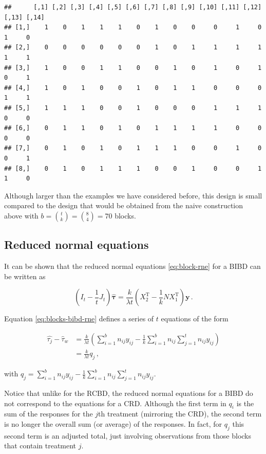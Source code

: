 \documentclass[
]{book}
\theoremstyle{definition}
\theoremstyle{definition}
\theoremstyle{definition}
\theoremstyle{definition}
\theoremstyle{remark}
\begin{document}
\begin{verbatim}
##      [,1] [,2] [,3] [,4] [,5] [,6] [,7] [,8] [,9] [,10] [,11] [,12] [,13] [,14]
## [1,]    1    0    1    1    1    0    1    0    0     0     1     0     1     0
## [2,]    0    0    0    0    0    0    1    0    1     1     1     1     1     1
## [3,]    1    0    0    1    1    0    0    1    0     1     0     1     0     1
## [4,]    1    0    1    0    0    1    0    1    1     0     0     0     1     1
## [5,]    1    1    1    0    0    1    0    0    0     1     1     1     0     0
## [6,]    0    1    1    0    1    0    1    1    1     1     0     0     0     0
## [7,]    0    1    0    1    0    1    1    1    0     0     1     0     0     1
## [8,]    0    1    0    1    1    1    0    0    1     0     0     1     1     0
\end{verbatim}

Although larger than the examples we have considered before, this design is small compared to the design that would be obtained from the naive construction above with \(b = {t \choose k} = {8 \choose 4} = 70\) blocks.

\hypertarget{reduced-normal-equations}{%
\subsection{Reduced normal equations}\label{reduced-normal-equations}}

It can be shown that the reduced normal equations \eqref{eq:block-rne} for a BIBD can be written as

\begin{equation}
\left(I_t - \frac{1}{t}J_t\right)\hat{\boldsymbol{\tau}} = \frac{k}{\lambda t}\left(X_2^{\mathrm{T}} - \frac{1}{k}NX_1^{\mathrm{T}}\right)\boldsymbol{y}\,.
\label{eq:blocks-bibd-rne}
\end{equation}

Equation \eqref{eq:blocks-bibd-rne} defines a series of \(t\) equations of the form

\begin{align*}
\hat{\tau_j} - \hat{\tau}_w & = \frac{k}{\lambda t}\left(\sum_{i = 1}^b n_{ij}y_{ij} - \frac{1}{k}\sum_{i=1}^bn_{ij}\sum_{j=1}^tn_{ij}y_{ij}\right) \\
& = \frac{k}{\lambda t} q_j\,,
\end{align*}

with \(q_j = \sum_{i = 1}^b n_{ij}y_{ij} - \frac{1}{k}\sum_{i=1}^bn_{ij}\sum_{j=1}^tn_{ij}y_{ij}\).

Notice that unlike for the RCBD, the reduced normal equations for a BIBD do not correspond to the equations for a CRD. Although the first term in \(q_i\) is the sum of the responses for the \(j\)th treatment (mirroring the CRD), the second term is no longer the overall sum (or average) of the responses. In fact, for \(q_j\) this second term is an adjusted total, just involving observations from those blocks that contain treatment \(j\).
\end{document}
